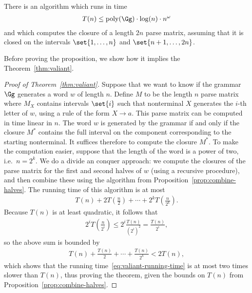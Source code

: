 \begin{proposition}\label{prop:combine-halves}
There is an algorithm which runs in time
\begin{align*}
T(n) \leq \mathrm{poly}(\Gg) \cdot \log(n) \cdot n^\omega
\end{align*}
and which computes the closure of a length $2n$ parse matrix,  assuming that it is closed on the intervals $\set{1,\ldots,n}$ and $\set{n+1,\ldots,2n}$.
\end{proposition}

Before proving the proposition, we show how it implies the Theorem~\ref{thm:valiant}.

\begin{proof}[Proof of Theorem~\ref{thm:valiant}]
Suppose that we want to know if the grammar $\Gg$ generates a word $w$ of length $n$. Define $M$ to be the length $n$ parse matrix where $M_X$ contains intervals $\set{i}$ such that nonterminal $X$ generates the $i$-th letter of $w$, using a rule of the form $X \to a$.
This parse matrix can be computed in time linear in $n$. 
The word $w$ is generated by the grammar if and only if the closure $M^*$ contains the full interval on the component corresponding to the starting nonterminal. It suffices therefore to compute the closure $M^*$. To make the computation easier, suppose that the length of the word is a power of two, i.e.~$n=2^k$. We do a divide an conquer approach: we compute the closures of the parse matrix for the first and second halves of $w$  (using a recursive procedure), and then combine these using the algorithm from Proposition~\ref{prop:combine-halves}. The running time of this algorithm is at most
\begin{align}\label{eq:valiant-running-time}
  T(n) + 2T(\frac n 2) + \cdots + 2^k T(\frac n {2^k}).
\end{align}	
Because $T(n)$ is at least quadratic, it follows that
\begin{align*}
  2^i T(\frac n {2^i}) \le 2^i \frac{T(n)}{\left(2^i\right)^2} = \frac{T(n)}{2^i},
\end{align*}
so the above sum is bounded by
\begin{align*}
  T(n) + \frac{T(n)}{2} + \cdots + \frac{T(n)}{2^k} < 2 T(n),
\end{align*}
which shows that the running time~\eqref{eq:valiant-running-time} is at most two times slower than $T(n)$, thus proving the theorem, given the bounds on $T(n)$ from Proposition~\ref{prop:combine-halves}. \end{proof}

